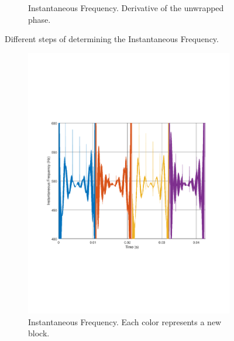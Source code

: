 \begin{figure}
\begin{subfigure}[t]{.5\textwidth}
		\caption{Instantaneous Frequency. Derivative of the unwrapped phase.}
		\label{fig:IFsub3}
	\end{subfigure} 
	\caption{Different steps of determining the Instantaneous Frequency.}
	\label{fig:IFexplained}
\end{figure}

\begin{figure}
	\centering
	\begin{subfigure}[t]{.49\textwidth}
		\centering
		\includegraphics[width=.9\linewidth, clip, trim={2cm 7cm 2cm 7cm}]{gfx/Modelling/IF.pdf}
		\caption{Instantaneous Frequency. Each color represents a new block.}
		\label{fig:IFout1}
	\end{subfigure} \hfill
	\begin{subfigure}[t]{.49\textwidth}
		\centering

\end{subfigure}
\end{figure}
